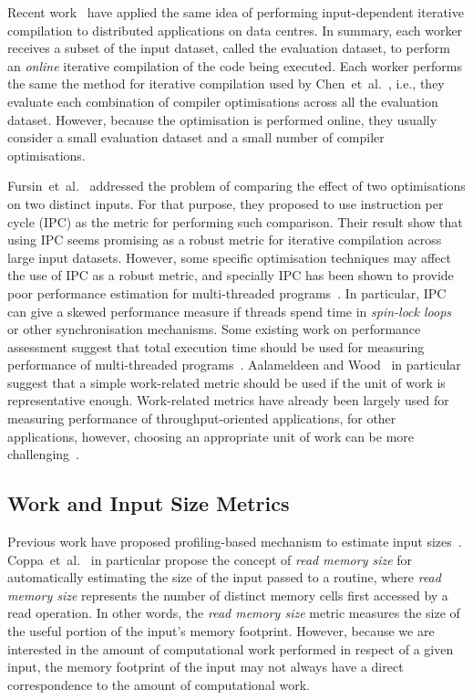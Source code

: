 \documentclass[sigplan,10pt]{acmart}
\theoremstyle{definition}
\newcommand{\etal}{et~al.}
\newcommand{\itercomp}{{iterative compilation}}
\begin{document}
Recent work~\cite{chen12b,fang15} have applied the same idea of performing input-dependent {\itercomp} to distributed applications on data centres.
In summary, each worker receives a subset of the input dataset, called the evaluation dataset, to perform an \textit{online} {\itercomp} of the code being executed.
Each worker performs the same the method for {\itercomp} used by Chen~\etal~\cite{chen10,chen12a}, i.e., they evaluate each combination of compiler optimisations across all the evaluation dataset.
However, because the optimisation is performed online, they usually consider a small evaluation dataset and a small number of compiler optimisations.

Fursin~\etal~\cite{fursin07} addressed the problem of comparing the effect of two optimisations on two distinct inputs. For that purpose, they proposed to use instruction per cycle (IPC) as the metric for performing such comparison.
Their result show that using IPC seems promising as a robust metric for {\itercomp} across large input datasets.
However, some specific optimisation techniques may affect the use of IPC as a robust metric, and specially IPC has been shown to provide poor performance estimation for multi-threaded programs~\cite{alameldeen06,eyerman08}.
In particular, IPC can give a skewed performance measure if threads spend time in \textit{spin-lock loops} or other synchronisation mechanisms. 
Some existing work on performance assessment suggest that total execution time should be used for measuring performance of multi-threaded programs~\cite{alameldeen06,eyerman08}.
Aalameldeen and Wood~\cite{alameldeen06} in particular suggest that a simple work-related metric should be used if the unit of work is representative enough.
Work-related metrics have already been largely used for measuring performance of throughput-oriented applications, for other applications, however, choosing an appropriate unit of work can be more challenging~\cite{alameldeen06}.

\subsection{Work and Input Size Metrics}

Previous work have proposed profiling-based mechanism to estimate input sizes~\cite{zaparanuks12,coppa14}.
Coppa~\etal~\cite{coppa14} in particular propose the concept of \textit{read memory size} for automatically estimating the size of the input passed to a routine, where \textit{read memory size} represents the number of distinct memory cells first accessed by a read operation.
In other words, the \textit{read memory size} metric measures the size of the useful portion of the input's memory footprint.
However, because we are interested in the amount of computational work performed in respect of a given input, the memory footprint of the input may not always have a direct correspondence to  the amount of computational work.
\end{document}
